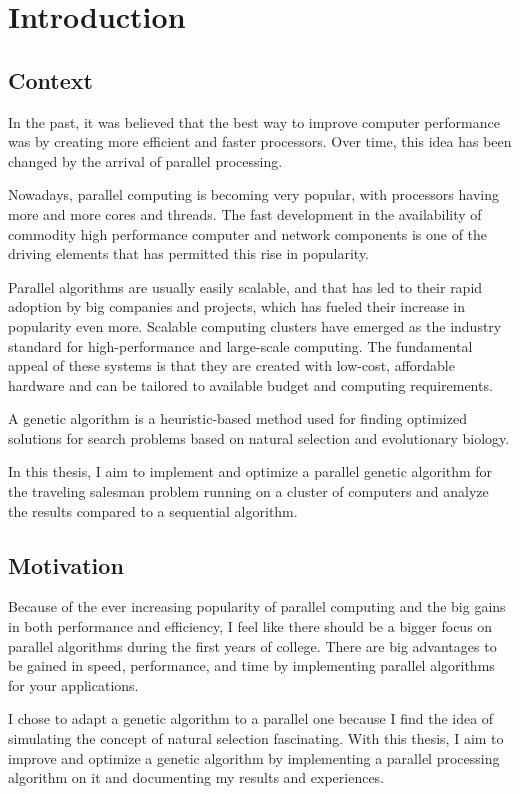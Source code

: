 \chapter*{Introduction} 

\section*{Context}

In the past, it was believed that the best way to improve computer performance was by creating more efficient and faster processors. Over time, this idea has been changed by the arrival of parallel processing.
\par
Nowadays, parallel computing is becoming very popular, with processors having more and more cores and threads. The fast development in the availability of commodity high performance computer and network components is one of the driving elements that has permitted this rise in popularity.
\par
Parallel algorithms are usually easily scalable, and that has led to their rapid adoption by big companies and projects, which has fueled their increase in popularity even more. Scalable computing clusters have emerged as the industry standard for high-performance and large-scale computing. The fundamental appeal of these systems is that they are created with low-cost, affordable hardware and can be tailored to available budget and computing requirements.
\par
A genetic algorithm is a heuristic-based method used for finding optimized solutions for search problems based on natural selection and evolutionary biology.
\par
In this thesis, I aim to implement and optimize a parallel genetic algorithm for the traveling salesman problem running on a cluster of computers and analyze the results compared to a sequential algorithm.

\pagebreak
\section*{Motivation}

Because of the ever increasing popularity of parallel computing and the big gains in both performance and efficiency, I feel like there should be a bigger focus on parallel algorithms during the first years of college. There are big advantages to be gained in speed, performance, and time by implementing parallel algorithms for your applications.
\par
I chose to adapt a genetic algorithm to a parallel one because I find the idea of simulating the concept of natural selection fascinating.
With this thesis, I aim to improve and optimize a genetic algorithm by implementing a parallel processing algorithm on it and documenting my results and experiences.

